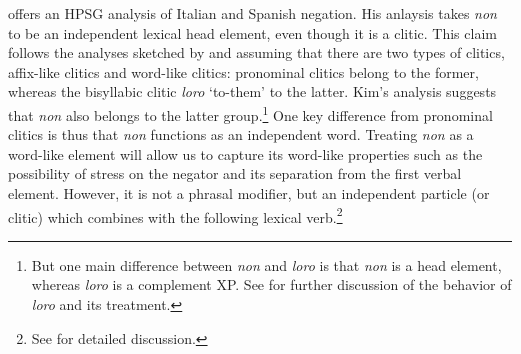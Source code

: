 \documentclass[output=paper
                ,modfonts
                ,nonflat
	        ,collection
	        ,collectionchapter
	        ,collectiontoclongg
 	        ,biblatex
                ,babelshorthands
                ,newtxmath
                ,draftmode
                ,colorlinks, citecolor=brown
]{./langsci/langscibook}
\begin{document}
{\begin{exe}
\begin{xlist}
\citet{Kim:00} offers an HPSG analysis of Italian and Spanish negation.
His anlaysis takes \textit{non}
to be an independent lexical head element, even though it is a clitic.
This claim follows the  analyses sketched by \citet{Monachesi:93} and \citet{Monachesi:98}
assuming that there are two types of clitics, affix-like
clitics and word-like clitics: pronominal clitics belong to the
former, whereas the bisyllabic clitic \textit{loro} `to-them' to the
latter. Kim's analysis suggests that \textit{non} also belongs
to the latter group.\footnote{But one main difference between
\textit{non} and \textit{loro} is that \textit{non} is a head
element, whereas \textit{loro} is a complement XP. See
\citet{Monachesi:98} for further discussion of the
behavior of \textit{loro} and its treatment.} One key difference from
pronominal clitics is thus that \textit{non} functions as an independent word.
Treating \textit{non} as
a word-like element will allow us to capture its word-like
properties such as the possibility of stress on the negator and
its separation from the first verbal element. However, it is not a
phrasal modifier, but an independent particle (or clitic) which combines with
the following lexical  verb.\footnote{See \citet{Kim:00} for
detailed discussion.}


\end{xlist}
\end{exe}}
\end{document}
